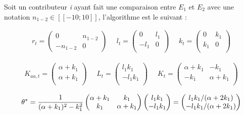 \begin{exemple}\label{example:n1}



Soit un contributeur \textit{i} ayant fait une comparaison entre $E_{1}$ et $E_{2}$ avec une notation $n_{1-2} \in [\![-10;10]\!]$, l'algorithme est le suivant :

\begin{align*}
r_{t}= \begin{pmatrix}
0 & n_{1-2} \\
-n_{1-2} & 0 
\end{pmatrix}
~~~~~~
l_{t}= \begin{pmatrix}
0 & l_1 \\
-l_1 & 0 \\
\end{pmatrix}
~~~~~~
k_{t}= \begin{pmatrix}
0 & k_1 \\
k_1 & 0 \\
\end{pmatrix}    
\end{align*}

\begin{align*}
K_{aa,t}= \begin{pmatrix}
\alpha + k_1\\
\alpha +  k_1\\
\end{pmatrix} 
~~~~~~
L_{t}= \begin{pmatrix}
l_1 k_1\\
-l_1 k_1 \\
\end{pmatrix} 
~~~~~~
K_{t}= \begin{pmatrix}
\alpha + k_1 & -k_1 \\
-k_1 & \alpha + k_1 \\
\end{pmatrix}
\end{align*}

\begin{align*}
\theta^*= \frac{1}{(\alpha + k_1)^2-k_1^2} \begin{pmatrix}
\alpha + k_1 & k_1 \\
k_1 & \alpha + k_1 \\
\end{pmatrix}\begin{pmatrix}
l_1 k_1\\
-l_1 k_1 \\
\end{pmatrix} 
= 
\begin{pmatrix}
l_1k_1 / (\alpha + 2k_1)\\
-l_1k_1 / (\alpha + 2k_1)\\
\end{pmatrix} 
\end{align*}
\end{exemple}
